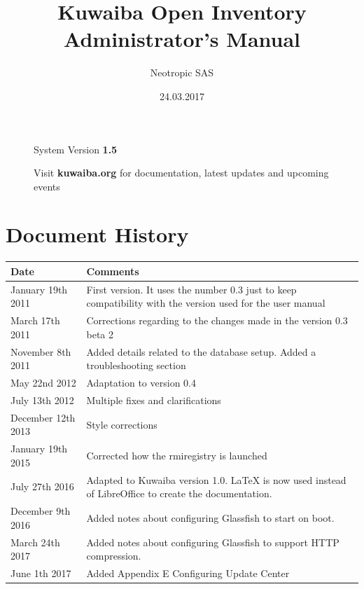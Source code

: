 \documentclass[a4paper]{article}
\title{Kuwaiba Open Inventory Administrator's Manual}
\author{Neotropic SAS}
\date{24.03.2017}
\begin{document}
	\maketitle
	
	
	
	\begin{figure}[b]
		\centering System Version \textbf{1.5}
			
		Visit \textbf{kuwaiba.org} for documentation, latest updates and upcoming events
	\end{figure}
	
	
	\newpage
	
	\tableofcontents

	\newpage
	\section{Document History}
		\begin{table}[h!]
			\centering
			\begin{tabular}{l||p{10cm}} %
				\toprule
				\textbf{Date} & \textbf{Comments}  \\
				\midrule
				January 19th 2011 & First version. It uses the number 0.3 just to keep compatibility with the version used for the user manual\\
				\midrule
				March 17th 2011 & Corrections regarding to the changes made in the version 0.3 beta 2 \\
				\midrule
				November 8th  2011 & Added details related to the database setup. Added a troubleshooting section \\
				\midrule
				May 22nd 2012 & Adaptation to version 0.4 \\
				\midrule
				July 13th 2012 & Multiple fixes and clarifications \\
				\midrule
				December 12th 2013 & Style corrections \\
				\midrule
				January 19th 2015 & Corrected how the rmiregistry is launched \\
				\midrule
				July 27th 2016 & Adapted to Kuwaiba version 1.0. LaTeX is now used instead of LibreOffice to create the documentation. \\
				\midrule
				December 9th 2016 & Added notes about configuring Glassfish to start on boot. \\
				\midrule
				March 24th 2017 & Added notes about configuring Glassfish to support HTTP compression. \\
				\midrule
				June 1th 2017 & Added Appendix E Configuring Update Center
				\midrule
				\bottomrule
			\end{tabular}	
				
		\end{table}
	\newpage
\end{document}
